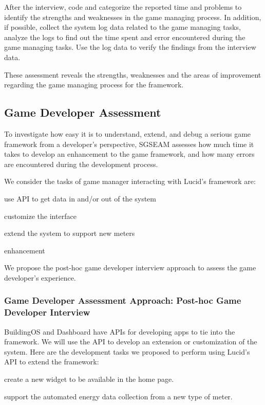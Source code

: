 \documentclass[11pt,oneside]{book}
\begin{document}
After the interview, code and categorize the reported time and problems to identify the strengths and weaknesses in the game managing process. In addition, if possible, collect the system log data related to the game managing tasks, analyze the logs to find out the time spent and error encountered during the game managing tasks. Use the log data to verify the findings from the interview data.

These assessment reveals the strengths, weaknesses and the areas of improvement regarding the game managing process for the framework.

\subsection{Game Developer Assessment}

To investigate how easy it is to understand, extend, and debug a serious game framework from a developer's 
perspective, SGSEAM assesses how much time it takes to develop an
enhancement to the game framework, and how many errors are encountered
during the development process.

We consider the tasks of game manager interacting with Lucid's framework are:

\begin{compactenum}
  \item use API to get data in and/or out of the system
  \item customize the interface
  \item extend the system to support new meters
  \item enhancement
\end{compactenum}

We propose the post-hoc game developer interview approach to assess the game developer's experience.
    
\subsubsection{Game Developer Assessment Approach: Post-hoc Game Developer Interview}
\label{Post-hoc game developer interview}

BuildingOS and Dashboard have APIs for developing apps to tie into the framework. We will use the API to develop an extension or customization of the system. Here are the development tasks we proposed to perform using Lucid's API to extend the framework:
\begin{compactenum}
  \item create a new widget to be available in the home page.
  \item support the automated energy data collection from a new type of meter.
\end{compactenum}
\end{document}
